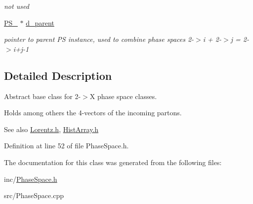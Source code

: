 \begin{DoxyCompactItemize}
\begin{DoxyCompactList}\small\item\em not used \end{DoxyCompactList}\item 
\hypertarget{classPS__2_abebb860c3c4a1c5054bc223d3aac4f45}{}\hyperlink{classPS__2}{P\+S\+\_} $\ast$ \hyperlink{classPS__2_abebb860c3c4a1c5054bc223d3aac4f45}{d\+\_\+parent}\label{classPS__2_abebb860c3c4a1c5054bc223d3aac4f45}

\begin{DoxyCompactList}\small\item\em pointer to parent P\+S instance, used to combine phase spaces 2-\/$>$i + 2-\/$>$j = 2-\/$>$i+j-\/1 \end{DoxyCompactList}\end{DoxyCompactItemize}


\subsection{Detailed Description}
Abstract base class for 2-\/$>$X phase space classes. 

Holds among others the 4-\/vectors of the incoming partons. \begin{DoxySeeAlso}{See also}
\hyperlink{Lorentz_8h}{Lorentz.\+h}, \hyperlink{HistArray_8h}{Hist\+Array.\+h} 
\end{DoxySeeAlso}


Definition at line 52 of file Phase\+Space.\+h.



The documentation for this class was generated from the following files\+:\begin{DoxyCompactItemize}
\item 
inc/\hyperlink{PhaseSpace_8h}{Phase\+Space.\+h}\item 
src/Phase\+Space.\+cpp\end{DoxyCompactItemize}
